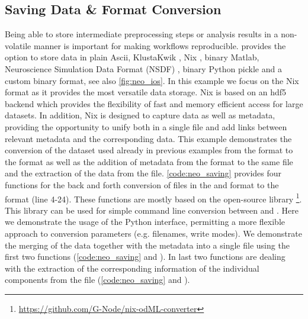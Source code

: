 \subsection{Saving Data \& Format Conversion}
\label{sec:nix_format}
Being able to store intermediate preprocessing steps or analysis results in a non-volatile manner is important for making workflows reproducible.  provides the option to store data in plain Ascii, KlustaKwik \citep{Hazan_2006}, Nix \citep{Stoewer_2014}, binary Matlab, Neuroscience Simulation Data Format (NSDF) \citep{Ray_2016}, binary Python pickle and a custom binary format, see also \cref{fig:neo_ios}. In this example we focus on the Nix format as it provides the most versatile data storage. Nix is based on an hdf5 \citep{TheHDFGroup_1997} backend which provides the flexibility of fast and memory efficient access for large datasets. In addition, Nix is designed to capture data as well as metadata, providing the opportunity to unify both in a single file and add links between relevant metadata and the corresponding data. 
This example demonstrates the conversion of the dataset used already in previous examples from the  format to the  format as well as the addition of metadata from the  format to the same file and the extraction of the data from the  file.
\cref{code:neo_saving} provides four functions for the back and forth conversion of files in the  and  format to the  format (line 4-24). These functions are mostly based on the open-source  library \footnote{\url{https://github.com/G-Node/nix-odML-converter}}. This library can be used for simple command line conversion between  and . Here we demonstrate the usage of the Python interface, permitting a more flexible approach to conversion parameters (e.g. filenames, write modes).
We demonstrate the merging of the data together with the metadata into a single  file using the first two functions (\cref{code:neo_saving}  and ). In last two functions are dealing with the extraction of the corresponding information of the individual components from the  file (\cref{code:neo_saving}  and ).

